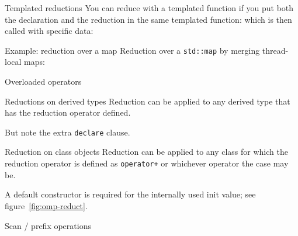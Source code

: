 \begin{cppnote}{Templated reductions}
  You can reduce with a templated function
  if you put both the declaration and the reduction
  in the same templated function:
  which is then called with specific data:
\end{cppnote}

\begin{cppnote}{Example: reduction over a map}
  Reduction over a \lstinline{std::map}
  by merging thread-local maps:
  \begin{multicols}{2}
    \columnbreak
  \end{multicols}
\end{cppnote}

 {Overloaded operators}

\begin{fortrannote}{Reductions on derived types}
  Reduction can be applied to any derived type that has the
  reduction operator defined.
  \begin{multicols}{2}
    \columnbreak
  \end{multicols}
  But note the extra \lstinline[language=omp]{declare} clause.  
\end{fortrannote}

\begin{cppnote}{Reduction on class objects}
  Reduction can be applied to any class for which the
  reduction operator is defined as \lstinline{operator+}
  or whichever operator the case may be.
  \begin{multicols}{2}
    \let\snippetoutputsize\footnotesize
    \columnbreak
  \end{multicols}
  A default constructor is required for the
  internally used init value;
  see figure~\ref{fig:omp-reduct}.
\end{cppnote}


 {Scan / prefix operations}

